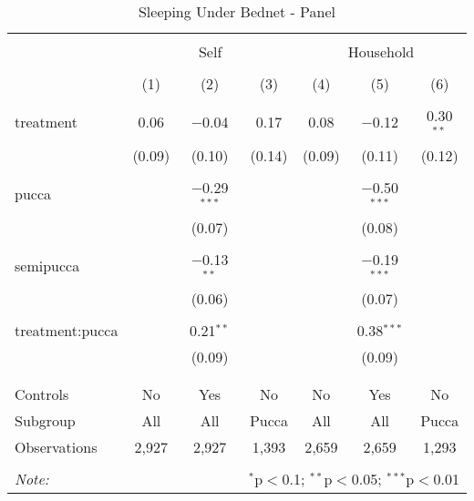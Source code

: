 
\begin{table}[!htbp] \centering 
  \caption{Sleeping Under Bednet - Panel} 
  \label{tbl:Sleeping Under Bednet - Panel} 
\begin{tabular}{@{\extracolsep{5pt}}lcccccc} 
\\[-1.8ex]\hline 
\hline \\[-1.8ex] 
 & \multicolumn{3}{c}{Self} & \multicolumn{3}{c}{Household} \\ 
\\[-1.8ex] & (1) & (2) & (3) & (4) & (5) & (6)\\ 
\hline \\[-1.8ex] 
 treatment & 0.06 & $-$0.04 & 0.17 & 0.08 & $-$0.12 & 0.30$^{**}$ \\ 
  & (0.09) & (0.10) & (0.14) & (0.09) & (0.11) & (0.12) \\ 
  & & & & & & \\ 
 pucca &  & $-$0.29$^{***}$ &  &  & $-$0.50$^{***}$ &  \\ 
  &  & (0.07) &  &  & (0.08) &  \\ 
  & & & & & & \\ 
 semipucca &  & $-$0.13$^{**}$ &  &  & $-$0.19$^{***}$ &  \\ 
  &  & (0.06) &  &  & (0.07) &  \\ 
  & & & & & & \\ 
 treatment:pucca &  & 0.21$^{**}$ &  &  & 0.38$^{***}$ &  \\ 
  &  & (0.09) &  &  & (0.09) &  \\ 
  & & & & & & \\ 
\hline \\[-1.8ex] 
Controls & No & Yes & No & No & Yes & No \\ 
Subgroup & All & All & Pucca & All & All & Pucca \\ 
Observations & 2,927 & 2,927 & 1,393 & 2,659 & 2,659 & 1,293 \\ 
\hline 
\hline \\[-1.8ex] 
\textit{Note:}  & \multicolumn{6}{r}{$^{*}$p$<$0.1; $^{**}$p$<$0.05; $^{***}$p$<$0.01} \\ 
\end{tabular} 
\end{table} 
